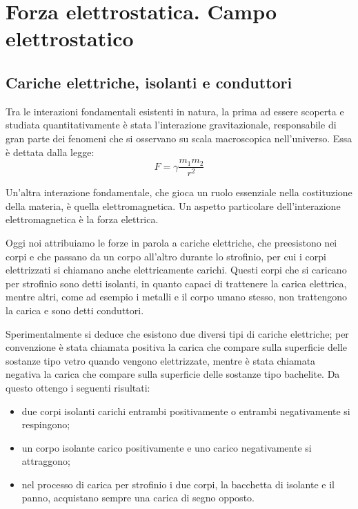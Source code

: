 \documentclass[class=book, crop=false, oneside, 12pt]{standalone}
\begin{document}
\chapter{Forza elettrostatica. Campo elettrostatico}

\section{Cariche elettriche, isolanti e conduttori}

Tra le interazioni fondamentali esistenti in natura, la prima ad essere scoperta e studiata quantitativamente è stata l'interazione gravitazionale, responsabile di gran parte dei fenomeni che si osservano su scala macroscopica nell'universo.
Essa è dettata dalla legge:
\begin{equation}
    F = \gamma \frac{m_1 m_2}{r^2}
\end{equation}

Un'altra interazione fondamentale, che gioca un ruolo essenziale nella costituzione della materia, è quella elettromagnetica. 
Un aspetto particolare dell'interazione elettromagnetica è la forza elettrica.

Oggi noi attribuiamo le forze in parola a cariche elettriche, che preesistono nei corpi e che passano da un corpo all'altro durante lo strofinio, per cui i corpi elettrizzati si chiamano anche elettricamente carichi.
Questi corpi che si caricano per strofinio sono detti isolanti, in quanto capaci di trattenere la carica elettrica, mentre altri, come ad esempio i metalli e il corpo umano stesso, non trattengono la carica e sono detti conduttori.

Sperimentalmente si deduce che esistono due diversi tipi di cariche elettriche; per convenzione è stata chiamata positiva la carica che compare sulla superficie delle sostanze tipo vetro quando vengono elettrizzate, mentre è stata chiamata negativa la carica che compare sulla superficie delle sostanze tipo bachelite.
Da questo ottengo i seguenti risultati:
\begin{itemize}
    \item due corpi isolanti carichi entrambi positivamente o entrambi negativamente si respingono; 
    \item un corpo isolante carico positivamente e uno carico negativamente si attraggono; 
    \item nel processo di carica per strofinio i due corpi, la bacchetta di isolante e il panno, acquistano sempre una carica di segno opposto. 
\end{itemize}
\end{document}
